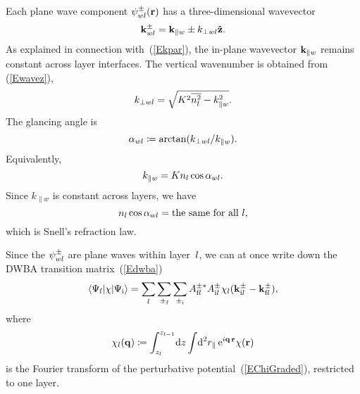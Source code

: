 Each plane wave component $\psi^\pm_{wl}(\mathbf{r})$ has
a three-dimensional wavevector
\begin{equation}\label{Ekpmwj3}
  \mathbf{k}^\pm_{wl}= \mathbf{k}_{\parallel w} \pm k_{\perp wl}\mathbf{\hat z}.
\end{equation}
%
%
As explained in connection with~(\ref{Ekpar}),
the in-plane wavevector $\mathbf{k}_{\parallel w}$ remains constant
across layer interfaces.
The vertical wavenumber is obtained from (\ref{Ewavez}),
\begin{equation}\label{Ekperpwj}
  k_{\perp wl} = \sqrt{K^2 \overline{n_l^2} - k_{\parallel w}^2}.
\end{equation}
The glancing angle is
\begin{equation}\label{Edef_alpha}
  \alpha_{wl}\coloneqq \arctan(k_{\perp wl}/k_{\parallel w}).  
\end{equation}
Equivalently,
\begin{equation}
  k_{\parallel w}=K n_l \cos\alpha_{wl}. 
\end{equation}
Since $k_{\parallel w}$ is constant across layers,
we have
\begin{equation}\label{ESnell}
  n_l \cos\alpha_{wl} = \text{the same for all }l,
\end{equation}
which is Snell's refraction law.

Since the $\psi^\pm_{wl}$ are plane waves within layer~$l$,
we can at once write down the DWBA transition matrix~(\ref{Edwba})
%
\begin{equation}\label{Edwba_ml0}
  \left\langle \Psi_{\text{f}}|\chi|\Psi_{\text{i}}\right\rangle
  = \sum_{l} \sum_{\pm_{\text{f}}} \sum_{\pm_{\text{i}}}
    A^{\pm *}_{\text{f} l} A^\pm_{\text{i} l} 
     \chi_l(\mathbf{k}^\pm_{\text{i} l}-\mathbf{k}^\pm_{\text{f} l}),
\end{equation}
where
\begin{equation}\label{Echij}
  \chi_l(\mathbf{q})
  \coloneqq  \int_{z_l}^{z_{l-1}}\!\text{d} z \int\!\text{d}^2r_\parallel\, \text{e}^{i\mathbf{q}\,\mathbf{r}}\chi(\mathbf{r})
\end{equation}
%
is the Fourier transform
of the perturbative potential~(\ref{EChiGraded}),
restricted to one layer.

